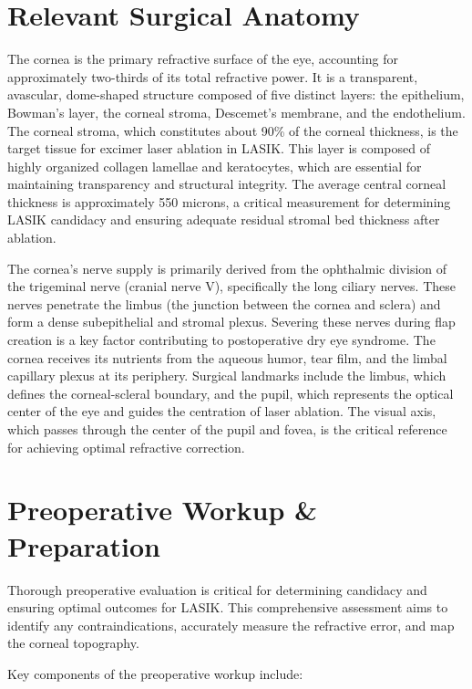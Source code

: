 \section*{Relevant Surgical Anatomy}
The cornea is the primary refractive surface of the eye, accounting for approximately two-thirds of its total refractive power. It is a transparent, avascular, dome-shaped structure composed of five distinct layers: the epithelium, Bowman's layer, the corneal stroma, Descemet's membrane, and the endothelium. The corneal stroma, which constitutes about 90\% of the corneal thickness, is the target tissue for excimer laser ablation in LASIK. This layer is composed of highly organized collagen lamellae and keratocytes, which are essential for maintaining transparency and structural integrity. The average central corneal thickness is approximately 550 microns, a critical measurement for determining LASIK candidacy and ensuring adequate residual stromal bed thickness after ablation.

The cornea's nerve supply is primarily derived from the ophthalmic division of the trigeminal nerve (cranial nerve V), specifically the long ciliary nerves. These nerves penetrate the limbus (the junction between the cornea and sclera) and form a dense subepithelial and stromal plexus. Severing these nerves during flap creation is a key factor contributing to postoperative dry eye syndrome. The cornea receives its nutrients from the aqueous humor, tear film, and the limbal capillary plexus at its periphery. Surgical landmarks include the limbus, which defines the corneal-scleral boundary, and the pupil, which represents the optical center of the eye and guides the centration of laser ablation. The visual axis, which passes through the center of the pupil and fovea, is the critical reference for achieving optimal refractive correction.

\section*{Preoperative Workup \& Preparation}
Thorough preoperative evaluation is critical for determining candidacy and ensuring optimal outcomes for LASIK. This comprehensive assessment aims to identify any contraindications, accurately measure the refractive error, and map the corneal topography.

Key components of the preoperative workup include:


